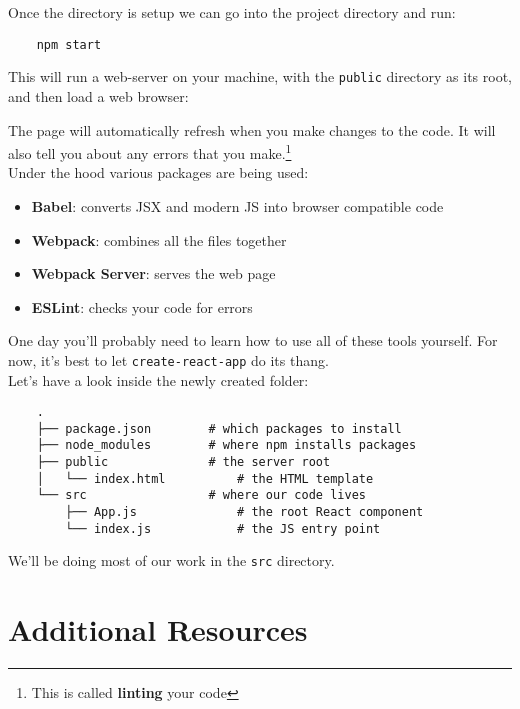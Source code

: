 Once the directory is setup we can go into the project directory and run:

\begin{verbatim}
    npm start
\end{verbatim}

This will run a web-server on your machine, with the \texttt{public} directory as its root, and then load a web browser:


The page will automatically refresh when you make changes to the code. It will also tell you about any errors that you make.\footnote{This is called \textbf{linting} your code}
\\

Under the hood various packages are being used:

\begin{itemize}
    \item \textbf{Babel}: converts JSX and modern JS into browser compatible code
    \item \textbf{Webpack}: combines all the files together
    \item \textbf{Webpack Server}: serves the web page
    \item \textbf{ESLint}: checks your code for errors
\end{itemize}

One day you'll probably need to learn how to use all of these tools yourself. For now, it's best to let \texttt{create-react-app} do its thang.
\\

Let's have a look inside the newly created folder:

\begin{verbatim}
    .
    ├── package.json        # which packages to install
    ├── node_modules        # where npm installs packages
    ├── public              # the server root
    │   └── index.html          # the HTML template
    └── src                 # where our code lives
        ├── App.js              # the root React component
        └── index.js            # the JS entry point
\end{verbatim}

We'll be doing most of our work in the \texttt{src} directory.


\section{Additional Resources}

